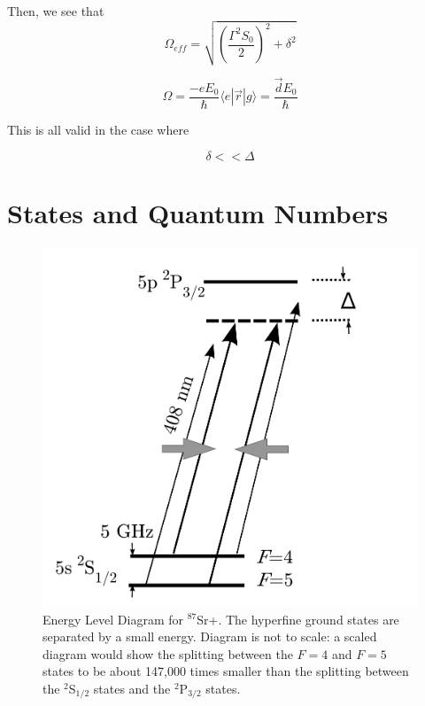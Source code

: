 Then, we see that 
\begin{equation}
\Omega_\mathit{eff}=\sqrt{\left(\frac{\Gamma^2S_0}{2}\right)^2 + \delta^2}
\end{equation}

\begin{equation}
\Omega = \frac{-eE_0}{\hbar}\langle e |\vec{r}|g\rangle=\frac{\vec{d}E_0}{\hbar}
\end{equation}

This is all valid in the case where 

\begin{equation}
\delta<<\Delta
\end{equation}



\section{States and Quantum Numbers}

\begin{figure}
\centerline{
\includegraphics[totalheight=0.3\textheight]{E_level_from_proposal}
}
\caption[Energy Level Diagram for $^{87}$Sr+]{Energy Level Diagram for $^{87}$Sr+. The hyperfine ground states are separated by a small energy. Diagram is not to scale: a scaled diagram would show the splitting between the $F=4$ and $F=5$ states to be about 147,000 times smaller than the splitting between the $^2$S$_{1/2}$ states and the $^2$P$_{3/2}$ states.}
\end{figure}

